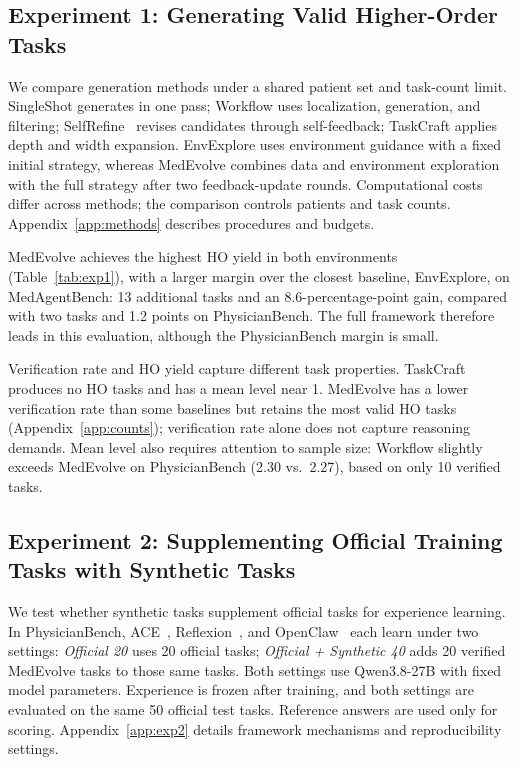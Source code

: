 \documentclass[11pt]{article}
\begin{document}
\subsection{Experiment 1: Generating Valid Higher-Order Tasks}

We compare generation methods under a shared patient set and task-count limit. SingleShot generates in one pass; Workflow uses localization, generation, and filtering; SelfRefine~\citep{madaan2023selfrefine} revises candidates through self-feedback; TaskCraft applies depth and width expansion. EnvExplore uses environment guidance with a fixed initial strategy, whereas MedEvolve combines data and environment exploration with the full strategy after two feedback-update rounds. Computational costs differ across methods; the comparison controls patients and task counts. Appendix~\ref{app:methods} describes procedures and budgets.

MedEvolve achieves the highest HO yield in both environments (Table~\ref{tab:exp1}), with a larger margin over the closest baseline, EnvExplore, on MedAgentBench: 13 additional tasks and an 8.6-percentage-point gain, compared with two tasks and 1.2 points on PhysicianBench. The full framework therefore leads in this evaluation, although the PhysicianBench margin is small.

Verification rate and HO yield capture different task properties. TaskCraft produces no HO tasks and has a mean level near 1. MedEvolve has a lower verification rate than some baselines but retains the most valid HO tasks (Appendix~\ref{app:counts}); verification rate alone does not capture reasoning demands. Mean level also requires attention to sample size: Workflow slightly exceeds MedEvolve on PhysicianBench (2.30 vs.\ 2.27), based on only 10 verified tasks.

\subsection{Experiment 2: Supplementing Official Training Tasks with Synthetic Tasks}

We test whether synthetic tasks supplement official tasks for experience learning. In PhysicianBench, ACE~\citep{zhang2026ace}, Reflexion~\citep{shinn2023reflexion}, and OpenClaw~\citep{openclaw2026} each learn under two settings: \emph{Official 20} uses 20 official tasks; \emph{Official + Synthetic 40} adds 20 verified MedEvolve tasks to those same tasks. Both settings use Qwen3.8-27B with fixed model parameters. Experience is frozen after training, and both settings are evaluated on the same 50 official test tasks. Reference answers are used only for scoring. Appendix~\ref{app:exp2} details framework mechanisms and reproducibility settings.
\end{document}
